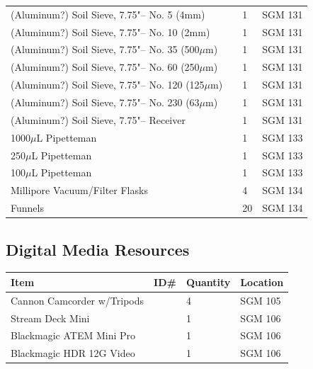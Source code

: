 \documentclass[12pt]{../SOP4_alpha}\usepackage[]{graphicx}\usepackage[]{xcolor}
\begin{document}
\begin{tabular}{|l|l|l|l|}
(Aluminum?) Soil Sieve, 7.75"-- No. 5 (4mm) && 1  & SGM 131 \\
(Aluminum?) Soil Sieve, 7.75"-- No. 10 (2mm) && 1  & SGM 131 \\
(Aluminum?) Soil Sieve, 7.75"-- No. 35 (500$\mu$m) && 1  & SGM 131 \\
(Aluminum?) Soil Sieve, 7.75"-- No. 60 (250$\mu$m) && 1  & SGM 131 \\
(Aluminum?) Soil Sieve, 7.75"-- No. 120 (125$\mu$m) && 1  & SGM 131 \\
(Aluminum?) Soil Sieve, 7.75"-- No. 230 (63$\mu$m) && 1  & SGM 131 \\
(Aluminum?) Soil Sieve, 7.75"-- Receiver      && 1  & SGM 131 \\
1000$\mu$L Pipetteman       && 1 & SGM 133\\
250$\mu$L Pipetteman        && 1 & SGM 133\\
100$\mu$L Pipetteman        && 1& SGM 133\\
Millipore Vacuum/Filter Flasks && 4 & SGM 134 \\
Funnels                     && 20 & SGM 134\\
\hline
\end{tabular}

\subsection{Digital Media Resources}
\begin{tabular}{|l|l|l|l|}
\hline
Item      & ID\#  & Quantity & Location \\ \hline
Cannon Camcorder w/Tripods   && 4 & SGM 105 \\
Stream Deck Mini && 1 & SGM 106 \\
Blackmagic ATEM Mini Pro && 1 & SGM 106\\
Blackmagic HDR 12G Video && 1 & SGM 106\\
\hline
\end{tabular}
\end{document}
